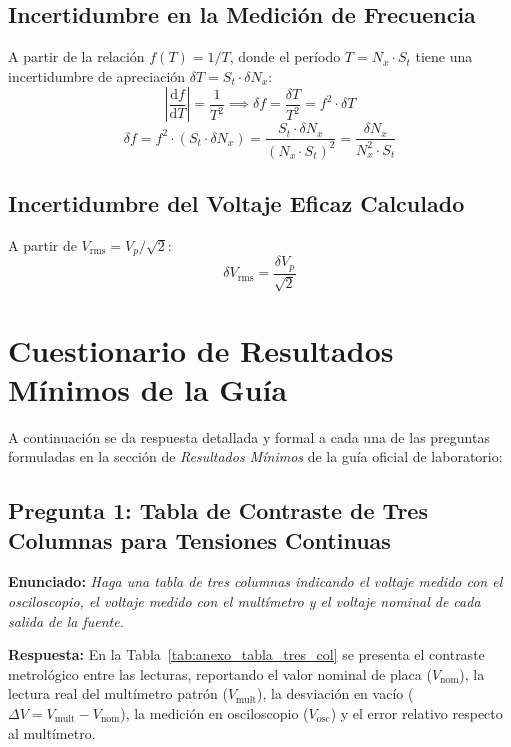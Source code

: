 \begin{appendices}
\subsection{Incertidumbre en la Medición de Frecuencia}
A partir de la relación $f(T) = 1/T$, donde el período $T = N_x \cdot S_t$ tiene una incertidumbre de apreciación $\delta T = S_t \cdot \delta N_x$:
\begin{equation}
    \left| \frac{\mathrm{d}f}{\mathrm{d}T} \right| = \frac{1}{T^2} \implies \delta f = \frac{\delta T}{T^2} = f^2 \cdot \delta T
\end{equation}
\begin{equation}
    \boxed{\delta f = f^2 \cdot (S_t \cdot \delta N_x) = \frac{S_t \cdot \delta N_x}{(N_x \cdot S_t)^2} = \frac{\delta N_x}{N_x^2 \cdot S_t}}
\end{equation}

\subsection{Incertidumbre del Voltaje Eficaz Calculado}
A partir de $V_{\text{rms}} = V_p / \sqrt{2}$:
\begin{equation}
    \boxed{\delta V_{\text{rms}} = \frac{\delta V_p}{\sqrt{2}}}
\end{equation}

\section{Cuestionario de Resultados Mínimos de la Guía}
\label{anexo:cuestionario_guia}

A continuación se da respuesta detallada y formal a cada una de las preguntas formuladas en la sección de \textit{Resultados Mínimos} de la guía oficial de laboratorio:

\subsection{Pregunta 1: Tabla de Contraste de Tres Columnas para Tensiones Continuas}
\textbf{Enunciado:} \textit{Haga una tabla de tres columnas indicando el voltaje medido con el osciloscopio, el voltaje medido con el multímetro y el voltaje nominal de cada salida de la fuente.}

\textbf{Respuesta:} En la Tabla~\ref{tab:anexo_tabla_tres_col} se presenta el contraste metrológico entre las lecturas, reportando el valor nominal de placa ($V_{\text{nom}}$), la lectura real del multímetro patrón ($V_{\text{mult}}$), la desviación en vacío ($\Delta V = V_{\text{mult}} - V_{\text{nom}}$), la medición en osciloscopio ($V_{\text{osc}}$) y el error relativo respecto al multímetro.


\end{appendices}
